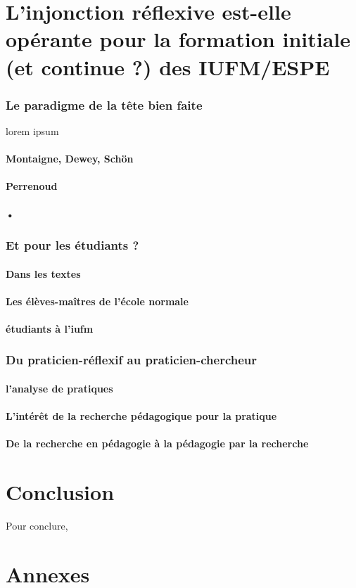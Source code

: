 \documentclass[a4paper,11pt]{article}
\begin{document}
\part{L'injonction réflexive est-elle opérante pour la formation initiale (et continue ?) des IUFM/ESPE}

\section{Le paradigme de la tête bien faite}
lorem ipsum
			\subsection{Montaigne, Dewey, Schön}
			\subsection{Perrenoud}
			\subsection{•}


\section{Et pour les étudiants ?}

			\subsection{Dans les textes}
			\subsection{Les élèves-maîtres de l'école normale}
			\subsection{étudiants à l'iufm}
			
\section{Du praticien-réflexif au praticien-chercheur}

			\subsection{l'analyse de pratiques}
			\subsection{L'intérêt de la recherche pédagogique pour la pratique}
			\subsection{De la recherche en pédagogie à la pédagogie par la recherche}



\part*{Conclusion}
Pour conclure,


\part*{Annexes}
\label{annexe1}

\nocite{*}


\end{document}
